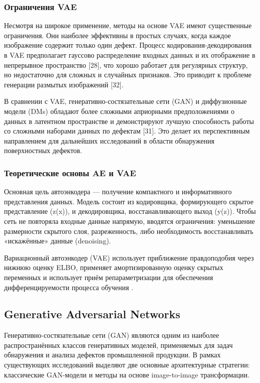 \documentclass[14pt,a4paper]{article}
\begin{document}
\subsubsection*{Ограничения VAE}
Несмотря на широкое применение, методы на основе VAE имеют существенные ограничения. Они наиболее эффективны в простых случаях, когда каждое изображение содержит только один дефект. Процесс кодирования-декодирования в VAE предполагает гауссово распределение входных данных и их отображение в непрерывное пространство [28], что хорошо работает для регулярных структур, но недостаточно для сложных и случайных признаков. Это приводит к проблеме генерации размытых изображений [32].

В сравнении с VAE, генеративно-состязательные сети (GAN) и диффузионные модели (DMs) обладают более сложными априорными предположениями о данных в латентном пространстве и демонстрируют лучшую способность работы со сложными наборами данных по дефектам [31]. Это делает их перспективным направлением для дальнейших исследований в области обнаружения поверхностных дефектов.

\subsubsection*{Теоретические основы AE и VAE}

Основная цель автоэнкодера — получение компактного и информативного представления данных. Модель состоит из кодировщика, формирующего скрытое представление (z(x)), и декодировщика, восстанавливающего выход (y(z)). Чтобы сеть не повторяла входные данные напрямую, вводятся ограничения: уменьшение размерности скрытого слоя, разреженность, либо необходимость восстанавливать «искажённые» данные (denoising).

Вариационный автоэнкодер (VAE) использует приближение правдоподобия через нижнюю оценку ELBO, применяет амортизированную оценку скрытых переменных и использует приём репараметризации для обеспечения дифференцируемости процесса обучения \cite{kingma2013autoencoding}.

\subsection{Generative Adversarial Networks}

Генеративно-состязательные сети (GAN) являются одним из наиболее распространённых классов генеративных моделей, применяемых для задач обнаружения и анализа дефектов промышленной продукции. В рамках существующих исследований выделяют две основные архитектурные стратегии: классические GAN-модели и методы на основе image-to-image трансформации.
\end{document}
